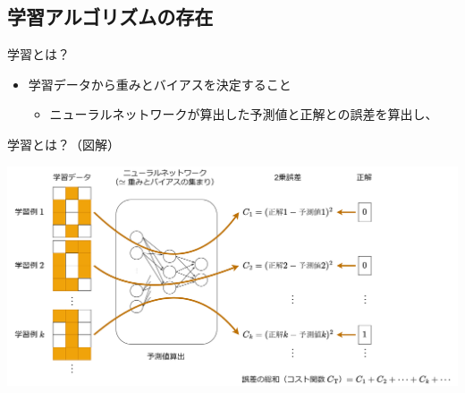 \documentclass[dvipdfmx,aspectratio=169]{beamer}
\begin{document}
	\subsection{学習アルゴリズムの存在}
	\begin{frame}{学習とは？}
		\begin{itemize}
			\item 学習データから\alert{重み}と\alert{バイアス}を決定すること
			\begin{itemize}
				\item ニューラルネットワークが算出した予測値と正解との誤差を算出し、\\ 
			\end{itemize}
		\end{itemize}
	\end{frame}
	\begin{frame}{学習とは？（図解）}
		\begin{center}
			\centering
			\includegraphics[width=1.0\linewidth]{img/誤差の総和の最小化}
		\end{center}
	\end{frame}	
\end{document}
